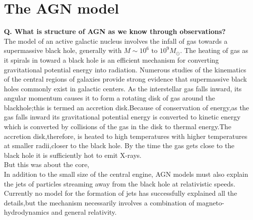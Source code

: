 \documentclass[10pt]{report}
\newcommand{\tbf}[1]{\textbf{#1}}
\begin{document}
 \section{The AGN model}
 \tbf{Q. What is structure of  AGN as we know through observations?}\\
 The model of an active galactic nucleus involves the infall of gas towards a supermassive black hole, generally with $M \sim10^6\text{ to }10^9 M_\odot$. The heating of gas as it spirals in toward a black hole is an efficient mechanism for converting gravitational potential energy into radiation. Numerous studies of the kinematics of the central regions of galaxies provide strong evidence that supermassive black holes commonly exist in galactic centers. As the interstellar gas falls inward, its angular momentum causes it to form a rotating disk of gas around the blackhole;this is termed an accretion disk.Because of conservation of energy,as the gas falls inward its gravitational potential energy is converted to kinetic energy which is converted by collisions of the gas in the disk to thermal energy.The accretion disk,therefore, is heated to high temperatures with higher temperatures at smaller radii,closer to the black hole. By the time the gas gets close to the black hole it is sufficiently hot to emit X-rays. \\
 
 But this was about the core,\\
 In addition to the small size of the central engine, AGN models must also explain the jets of particles streaming away from the black hole at relativistic speeds. Currently no model for the formation of jets has successfully explained all the details,but the mechanism necessarily involves a combination of magneto-hydrodynamics and general relativity.\\
 
\end{document}

